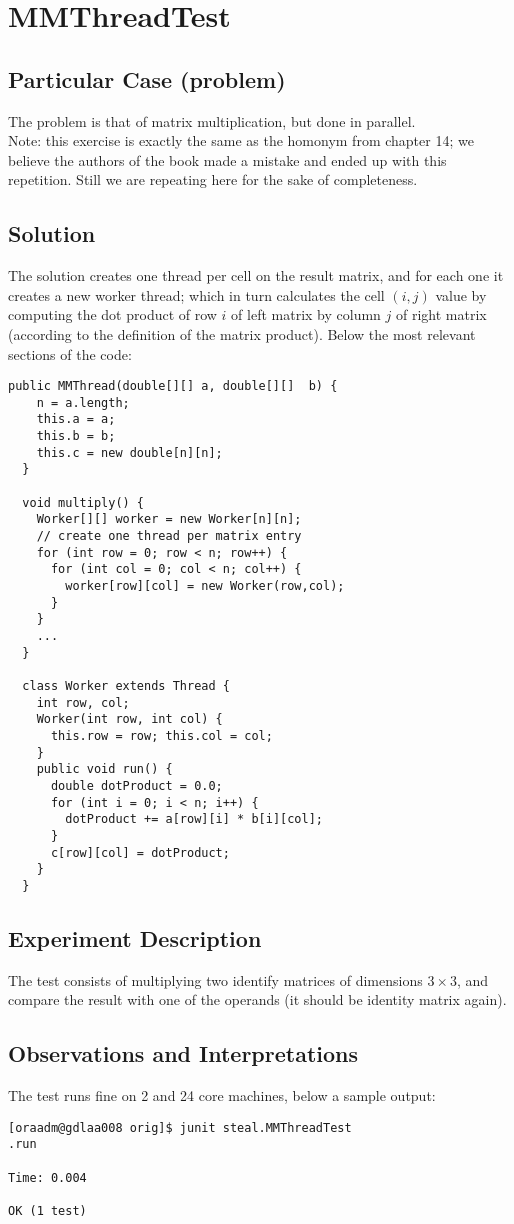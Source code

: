\section{\textbf{MMThreadTest}}

\subsection{Particular Case (problem)}
The problem is that of matrix multiplication, but done in parallel. \\

Note: this exercise is exactly the same as the homonym from chapter
14; we believe the authors of the book made a mistake and ended up
with this repetition. Still we are repeating here for the sake of
completeness.

\subsection{Solution}
The solution creates one thread per cell on the result matrix, and for
each one it creates a new worker thread; which in turn calculates the
cell $(i,j)$ value by computing the dot product of row $i$ of left
matrix by column $j$ of right matrix (according to the definition of
the matrix product). Below the most relevant sections of the code: \\

\begin{lstlisting}[style=numbers]
  public MMThread(double[][] a, double[][]  b) {
    n = a.length;
    this.a = a;
    this.b = b;
    this.c = new double[n][n];
  }
  
  void multiply() {
    Worker[][] worker = new Worker[n][n];
    // create one thread per matrix entry
    for (int row = 0; row < n; row++) {
      for (int col = 0; col < n; col++) {
        worker[row][col] = new Worker(row,col);
      }
    }
    ...
  }

  class Worker extends Thread {
    int row, col;
    Worker(int row, int col) {
      this.row = row; this.col = col;
    }
    public void run() {
      double dotProduct = 0.0;
      for (int i = 0; i < n; i++) {
        dotProduct += a[row][i] * b[i][col];
      }
      c[row][col] = dotProduct;
    }
  }  
\end{lstlisting}
\hfill

\subsection{Experiment Description}
The test consists of multiplying two identify matrices of dimensions
$3 \times 3$, and compare the result with one of the operands (it
should be identity matrix again).

\subsection{Observations and Interpretations}
The test runs fine on 2 and 24 core machines, below a sample output: \\

\begin{verbatim}
[oraadm@gdlaa008 orig]$ junit steal.MMThreadTest
.run

Time: 0.004

OK (1 test)
\end{verbatim}
\hfill

